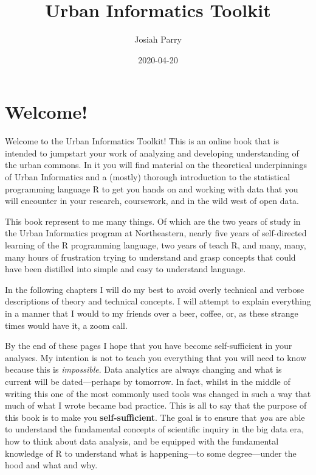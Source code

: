 \documentclass[
]{book}
\title{Urban Informatics Toolkit}
\author{Josiah Parry}
\date{2020-04-20}
\begin{document}
\maketitle

{
\setcounter{tocdepth}{1}
\tableofcontents
}
\hypertarget{welcome}{%
\chapter{Welcome!}\label{welcome}}

Welcome to the Urban Informatics Toolkit! This is an online book that is intended to jumpstart your work of analyzing and developing understanding of the urban commons. In it you will find material on the theoretical underpinnings of Urban Informatics and a (mostly) thorough introduction to the statistical programming language R to get you hands on and working with data that you will encounter in your research, coursework, and in the wild west of open data.

This book represent to me many things. Of which are the two years of study in the Urban Informatics program at Northeastern, nearly five years of self-directed learning of the R programming language, two years of teach R, and many, many, many hours of frustration trying to understand and grasp concepts that could have been distilled into simple and easy to understand language.

In the following chapters I will do my best to avoid overly technical and verbose descriptions of theory and technical concepts. I will attempt to explain everything in a manner that I would to my friends over a beer, coffee, or, as these strange times would have it, a zoom call.

By the end of these pages I hope that you have become self-sufficient in your analyses. My intention is not to teach you everything that you will need to know because this is \emph{impossible}. Data analytics are always changing and what is current will be dated---perhaps by tomorrow. In fact, whilst in the middle of writing this one of the most commonly used tools was changed in such a way that much of what I wrote became bad practice. This is all to say that the purpose of this book is to make you \textbf{self-sufficient}. The goal is to ensure that \emph{you} are able to understand the fundamental concepts of scientific inquiry in the big data era, how to think about data analysis, and be equipped with the fundamental knowledge of R to understand what is happening---to some degree---under the hood and what and why.
\end{document}
